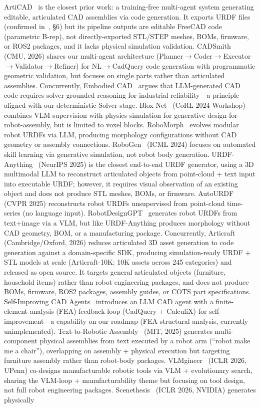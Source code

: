 \documentclass[conference]{IEEEtran}
\begin{document}
ArtiCAD~\cite{articad2026} is the closest prior work: a training-free multi-agent system generating editable, articulated CAD assemblies via code generation. It exports URDF files (confirmed in~\cite{articad2026}, §6) but its pipeline outputs are editable FreeCAD code (parametric B-rep), not directly-exported STL/STEP meshes, BOMs, firmware, or ROS2 packages, and it lacks physical simulation validation. CADSmith~\cite{cadsmith2026} (CMU, 2026) shares our multi-agent architecture (Planner$\to$Coder$\to$Executor$\to$Validator$\to$Refiner) for NL$\to$CadQuery code generation with programmatic geometric validation, but focuses on single parts rather than articulated assemblies. Concurrently, Embodied CAD~\cite{embodiedcad2026} argues that LLM-generated CAD code requires solver-grounded reasoning for industrial reliability---a principle aligned with our deterministic Solver stage. Blox-Net~\cite{bloxnet2025} (CoRL 2024 Workshop) combines VLM supervision with physics simulation for generative design-for-robot-assembly, but is limited to voxel blocks. RoboMorph~\cite{robomorph2024} evolves modular robot URDFs via LLM, producing morphology configurations without CAD geometry or assembly connections. RoboGen~\cite{robogen2024} (ICML 2024) focuses on automated skill learning via generative simulation, not robot body generation. URDF-Anything~\cite{urdanything2025} (NeurIPS 2025) is the closest end-to-end URDF generator, using a 3D multimodal LLM to reconstruct articulated objects from point-cloud + text input into executable URDF; however, it requires visual observation of an existing object and does not produce STL meshes, BOMs, or firmware. AutoURDF~\cite{autourdf2025} (CVPR 2025) reconstructs robot URDFs unsupervised from point-cloud time-series (no language input). RobotDesignGPT~\cite{robotdesigngpt2026} generates robot URDFs from text+image via a VLM, but like URDF-Anything produces morphology without CAD geometry, BOM, or a manufacturing package. Concurrently, Articraft~\cite{articraft2026} (Cambridge/Oxford, 2026) reduces articulated 3D asset generation to code generation against a domain-specific SDK, producing simulation-ready URDF + STL models at scale (Articraft-10K: 10K assets across 245 categories) and released as open source. It targets general articulated objects (furniture, household items) rather than robot engineering packages, and does not produce BOMs, firmware, ROS2 packages, assembly guides, or COTS part specifications. Self-Improving CAD Agents~\cite{selfimprovingcad2026} introduces an LLM CAD agent with a finite-element-analysis (FEA) feedback loop (CadQuery + CalculiX) for self-improvement---a capability on our roadmap (FEA structural analysis, currently unimplemented). Text-to-Robotic-Assembly~\cite{text2assembly2025} (MIT, 2025) generates multi-component physical assemblies from text executed by a robot arm (``robot make me a chair''), overlapping on assembly + physical execution but targeting furniture assembly rather than robot-body packages. VLMgineer~\cite{vlmgineer2026} (ICLR 2026, UPenn) co-designs manufacturable robotic tools via VLM + evolutionary search, sharing the VLM-loop + manufacturability theme but focusing on tool design, not full robot engineering packages. Scenethesis~\cite{scenethesis2026} (ICLR 2026, NVIDIA) generates physically 
\end{document}

